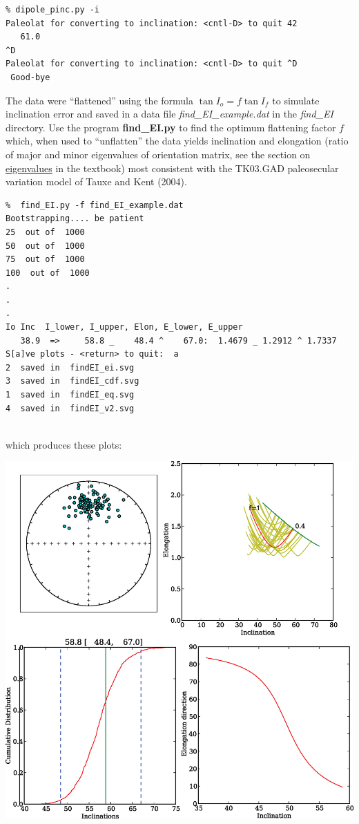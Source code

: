 \documentclass[11pt]{book}
\begin{document}
{{{\begin{verbatim}
% dipole_pinc.py -i
Paleolat for converting to inclination: <cntl-D> to quit 42
   61.0
^D
Paleolat for converting to inclination: <cntl-D> to quit ^D
 Good-bye 
\end{verbatim}


The data were ``flattened'' using the formula $ \tan I_o = f \tan I_f$ to simulate inclination error and saved in a data file {\it find\_EI\_example.dat} in the {\it find\_EI} directory.    
Use the program {\bf find\_EI.py} to find the optimum flattening factor $f$ which, when used to ``unflatten'' the data  yields inclination   and  elongation (ratio of major and minor eigenvalues of orientation matrix, see the section on  \href{Webbook2.html#orientation_tensor}{eigenvalues} in the textbook)  most consistent with the TK03.GAD paleosecular variation model of Tauxe and Kent (2004). \nocite{tauxe04d}     


\begin{verbatim}
%  find_EI.py -f find_EI_example.dat
Bootstrapping.... be patient
25  out of  1000
50  out of  1000
75  out of  1000
100  out of  1000
.
.
.
Io Inc  I_lower, I_upper, Elon, E_lower, E_upper
   38.9  =>     58.8 _    48.4 ^    67.0:  1.4679 _ 1.2912 ^ 1.7337
S[a]ve plots - <return> to quit:  a
2  saved in  findEI_ei.svg
3  saved in  findEI_cdf.svg
1  saved in  findEI_eq.svg
4  saved in  findEI_v2.svg


\end{verbatim}

\noindent which produces these plots:



\includegraphics[width= 15 cm]{EPSfiles/find_EI.eps}

}}}
\end{document}

